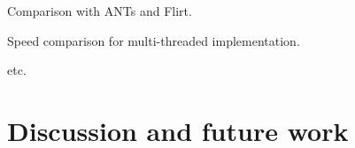\documentclass{llncs}
\begin{document}
Comparison with ANTs and Flirt.  

Speed comparison for multi-threaded implementation.

etc.
\section{Discussion and future work}

\begin{comment}
{
\section{Deliverables}
\subsection{Usability}
\begin{description}
\item [Automate parameter scaling] base this on empirical statistics
  ``learning'' on a per registration problem basis.
\item [GetParameterSuggestion] metric and trasformation classes should
  recommend parameters from a developer-defined set.
\item [Multi-core implementations] multi threading of metric,
  regularization, parameter update, etc.  stephen indicates that the
  setparameters function may cause problems.   
\item [Unify the dense and sparse frameworks] metrics and
  transformations should be reusable across frameworks. 
\end{description}

\subsection{Data Types}
Transform vectors, curves and tensors with reorientation.

\subsection{Metrics}
\begin{description}
\item [metrics]  derivatives should be bi-directional.
\item [MI and NMI]  Shreyas --- MI and NMI multicore. 
\item [ATG Neighborhood Cross Correlation] our approximation to the
  NCC derivative.  
\item [PSE Metric] with arbitrary data type.  ObjectMetric ...
\item [Tractography/vector flow metric]  vector based.  distance transform?
\item [Multivariate metric] plug in metrics and weights and a
  ``combination'' strategy.  e.g. match 1-norm, 2-norm, etc before weighting. 
\end{description}


\end{comment}
\end{document}
